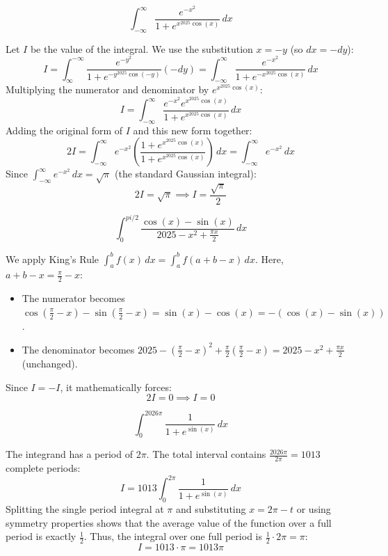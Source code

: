 \begin{questions}
    \question 
    \[ \int_{-\infty}^{\infty} \frac{e^{-x^{2}}}{1+e^{x^{2025}\cos(x)}} \, dx \]
    \begin{solution}
        Let $I$ be the value of the integral. We use the substitution $x = -y$ (so $dx = -dy$):
        \[ I = \int_{\infty}^{-\infty} \frac{e^{-y^2}}{1+e^{-y^{2025}\cos(-y)}} (-dy) = \int_{-\infty}^{\infty} \frac{e^{-x^2}}{1+e^{-x^{2025}\cos(x)}} \, dx \]
        Multiplying the numerator and denominator by $e^{x^{2025}\cos(x)}$:
        \[ I = \int_{-\infty}^{\infty} \frac{e^{-x^2}e^{x^{2025}\cos(x)}}{1+e^{x^{2025}\cos(x)}} \, dx \]
        Adding the original form of $I$ and this new form together:
        \[ 2I = \int_{-\infty}^{\infty} e^{-x^2} \left( \frac{1 + e^{x^{2025}\cos(x)}}{1 + e^{x^{2025}\cos(x)}} \right) \, dx = \int_{-\infty}^{\infty} e^{-x^2} \, dx \]
        Since $\int_{-\infty}^{\infty} e^{-x^2} \, dx = \sqrt{\pi}$ (the standard Gaussian integral):
        \[ 2I = \sqrt{\pi} \implies I = \frac{\sqrt{\pi}}{2} \]
    \end{solution}

    \question 
    \[ \int_{0}^{pi/2} \frac{\cos(x)-\sin(x)}{2025-x^{2}+\frac{\pi x}{2}} \, dx \]
    \begin{solution}
        We apply King's Rule $\int_{a}^{b} f(x) \, dx = \int_{a}^{b} f(a+b-x) \, dx$. Here, $a+b-x = \frac{\pi}{2}-x$:
        \begin{itemize}
            \item The numerator becomes $\cos(\frac{\pi}{2}-x) - \sin(\frac{\pi}{2}-x) = \sin(x) - \cos(x) = -(\cos(x) - \sin(x))$.
            \item The denominator becomes $2025 - (\frac{\pi}{2}-x)^2 + \frac{\pi}{2}(\frac{\pi}{2}-x) = 2025 - x^2 + \frac{\pi x}{2}$ (unchanged).
        \end{itemize}
        Since $I = -I$, it mathematically forces:
        \[ 2I = 0 \implies I = 0 \]
    \end{solution}

    \question 
    \[ \int_{0}^{2026\pi} \frac{1}{1+e^{\sin(x)}} \, dx \]
    \begin{solution}
        The integrand has a period of $2\pi$. The total interval contains $\frac{2026\pi}{2\pi} = 1013$ complete periods:
        \[ I = 1013 \int_{0}^{2\pi} \frac{1}{1+e^{\sin(x)}} \, dx \]
        Splitting the single period integral at $\pi$ and substituting $x = 2\pi - t$ or using symmetry properties shows that the average value of the function over a full period is exactly $\frac{1}{2}$. Thus, the integral over one full period is $\frac{1}{2} \cdot 2\pi = \pi$:
        \[ I = 1013 \cdot \pi = 1013\pi \]
    \end{solution}


\end{questions}
